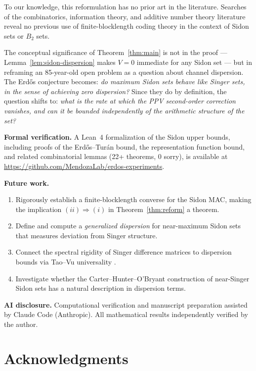\documentclass[12pt]{amsart}
\begin{document}
To our knowledge, this reformulation has no prior art in the literature.
Searches of the combinatorics, information theory, and additive number theory
literature reveal no previous use of finite-blocklength coding theory in the
context of Sidon sets or $B_2$ sets.

The conceptual significance of Theorem~\ref{thm:main} is not in the
proof --- Lemma~\ref{lem:sidon-dispersion} makes $V = 0$ immediate for any
Sidon set --- but in reframing an 85-year-old open problem as a question about
channel dispersion.  The Erd\H{o}s conjecture becomes: \emph{do maximum Sidon
sets behave like Singer sets, in the sense of achieving zero dispersion?}
Since they do by definition, the question shifts to: \emph{what is the rate
at which the PPV second-order correction vanishes, and can it be bounded
independently of the arithmetic structure of the set?}

\medskip
\noindent\textbf{Formal verification.}
A Lean~4 formalization of the Sidon upper bounds, including proofs of the
Erd\H{o}s--Tur\'{a}n bound, the representation function bound, and related
combinatorial lemmas (22+ theorems, 0 sorry), is available at
\href{https://github.com/MendozaLab/erdos-experiments}{https://github.com/MendozaLab/erdos-experiments}.

\medskip
\noindent\textbf{Future work.}
\begin{enumerate}
\item Rigorously establish a finite-blocklength converse for the Sidon MAC,
  making the implication $(ii) \Rightarrow (i)$ in Theorem~\ref{thm:reform} a
  theorem.
\item Define and compute a \emph{generalized dispersion} for near-maximum Sidon
  sets that measures deviation from Singer structure.
\item Connect the spectral rigidity of Singer difference matrices to dispersion
  bounds via Tao--Vu universality \cite{TV06}.
\item Investigate whether the Carter--Hunter--O'Bryant \cite{CHO25} construction
  of near-Singer Sidon sets has a natural description in dispersion terms.
\end{enumerate}

\medskip
\noindent\textbf{AI disclosure.}
Computational verification and manuscript preparation assisted by Claude Code
(Anthropic).  All mathematical results independently verified by the author.

\section*{Acknowledgments}
\end{document}
